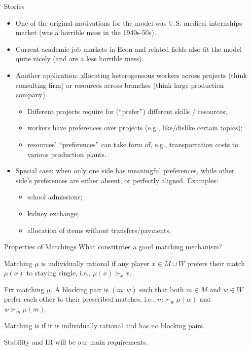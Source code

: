 \documentclass[english,10pt
,aspectratio=169
]{beamer}
\begin{document}
\begin{frame}{Stories}
\begin{itemize}
	\item One of the original motivations for the model was U.S. medical internships market (was a horrible mess in the 1940s-50s). 
	\item Current academic job markets in Econ and related fields also fit the model quite nicely (and are a less horrible mess).
	\item Another application: allocating heterogeneous workers across projects (think consulting firm) or resources across branches (think large production company).
	\begin{itemize}
		\item Different projects require for (``prefer'') different skills / resources;
		\item workers have preferences over projects (e.g., like/dislike certain topics);
		\item resources' ``preferences'' can take form of, e.g., transportation costs to various production plants.
	\end{itemize}
	\item Special case: when only one side has meaningful preferences, while other side's preferences are either absent, or perfectly aligned. Examples:
	\begin{itemize}
		\item school admissions;
		\item kidney exchange;
		\item allocation of items without transfers/payments.
	\end{itemize}
\end{itemize}
\end{frame}


\begin{frame}{Properties of Matchings}
What constitutes a good matching mechanism?
\begin{definition}
	Matching \alert{$\mu$} is \alert{individually rational} if any player $x \in M \cup W$ prefers their match $\mu(x)$ to staying single, i.e., $\mu(x) \succ_x x$.
\end{definition}
\begin{definition}
	Fix matching $\mu$. A \alert{blocking pair} is \alert{$(m,w)$} such that both $m \in M$ and $w \in W$ prefer each other to their prescribed matches, i.e., $m \succ_w \mu(w)$ and $w \succ_m \mu(m)$.
\end{definition}
\begin{definition}
	Matching \structure{$\mu$} is  if it is individually rational and has no blocking pairs.
\end{definition}
Stability and IR will be our main requirements.
\end{frame}
\end{document}

